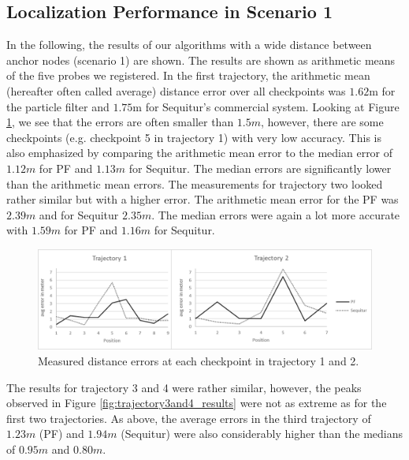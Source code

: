 \subsection{Localization Performance in Scenario 1}
In the following, the results of our algorithms with a wide distance between anchor nodes (scenario 1) are shown. The results are shown as arithmetic means of the five probes we registered. In the first trajectory, the arithmetic mean (hereafter often called average) distance error over all checkpoints was $1.62$m for the particle filter and $1.75$m for Sequitur's commercial system. Looking at Figure \ref{fig:trajectory1and2_results}, we see that the errors are often smaller than $1.5m$, however, there are some checkpoints (e.g. checkpoint 5 in trajectory 1) with very low accuracy. This is also emphasized by comparing the arithmetic mean error to the median error of $1.12m$ for PF and $1.13m$ for Sequitur. The median errors are significantly lower than the arithmetic mean errors. The measurements for trajectory two looked rather similar but with a higher error. The arithmetic mean error for the PF was $2.39m$ and for Sequitur $2.35m$. The median errors were again a lot more accurate with $1.59m$ for PF and $1.16m$ for Sequitur.
\begin{figure}[th]
\centering
\includegraphics[width=1.0\textwidth]{Figures/trajectory1_2_results}
\decoRule
\caption[Localization Results of Trajectory 1 and 2]{Measured distance errors at each checkpoint in trajectory 1 and 2.}
\label{fig:trajectory1and2_results}
\end{figure}
The results for trajectory 3 and 4 were rather similar, however, the peaks observed in Figure \ref{fig:trajectory3and4_results} were not as extreme as for the first two trajectories. As above, the average errors in the third trajectory of $1.23m$ (PF) and $1.94m$ (Sequitur) were also considerably higher than the medians of $0.95m$ and $0.80m$.
